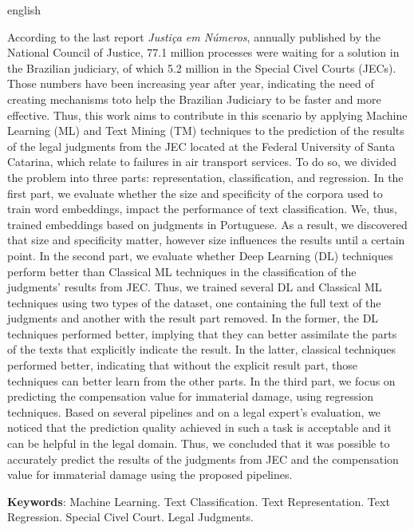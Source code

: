 

\begin{resumo}[Abstract]
	\SingleSpacing
	\begin{otherlanguage*}{english}
	
According to the last report \textit{Justiça em Números}, annually published by the National Council of Justice, 77.1 million processes were waiting for a solution in the Brazilian judiciary, of which 5.2 million in the Special Civel Courts (JECs). Those numbers have been increasing year after year, indicating the need of creating mechanisms toto help the Brazilian Judiciary to be faster and more effective. Thus, this work aims to contribute in this scenario by applying Machine Learning (ML) and Text Mining (TM) techniques to the prediction of the results of the legal judgments from the JEC located at the Federal University of Santa Catarina, which relate to failures in air transport services. To do so, we divided the problem into three parts: representation, classification, and regression. In the first part, we evaluate whether the size and specificity of the corpora used to train word embeddings, impact the performance of text classification. We, thus, trained embeddings based on judgments in Portuguese. As a result, we discovered that size and specificity matter, however size influences the results until a certain point. In the second part, we evaluate whether Deep Learning (DL) techniques perform better than Classical ML techniques in the classification of the judgments' results from JEC. Thus, we trained several DL and Classical ML techniques using two types of the dataset, one containing the full text of the judgments and another with the result part removed. In the former, the DL techniques performed better, implying that they can better assimilate the parts  of the texts that explicitly indicate the result. In the latter, classical techniques performed better, indicating that without the explicit result part, those techniques can better learn from the other parts. In the third part, we focus on predicting the compensation value for immaterial damage, using regression techniques. Based on several pipelines and on a legal expert's evaluation, we noticed that the prediction quality achieved in such a task is acceptable and it can be helpful in the legal domain. Thus, we concluded that it was possible to accurately predict the results of the judgments from JEC and the compensation value for immaterial damage using the proposed pipelines.


\textbf{\textsf{Keywords}}: Machine Learning. Text Classification. Text Representation. Text Regression. Special Civel Court. Legal Judgments.
	\end{otherlanguage*}
\end{resumo}

